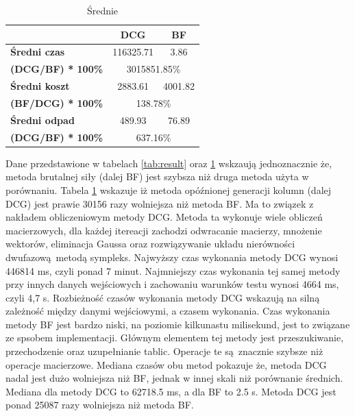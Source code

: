 \begin{table}[]
\centering
\caption{Średnie}
\label{tab:average}
\begin{tabular}{|l|c|c|}
\hline
                                           & \textbf{DCG}   & \textbf{BF}   \\ \hline
\textbf{Średni czas}                       & 116325.71      & 3.86          \\ \hline
\textbf{(DCG/BF) * 100\%}  & \multicolumn{2}{c|}{3015851.85\%} \\ \hline
\textbf{Średni koszt}                      & 2883.61        & 4001.82       \\ \hline
\textbf{(BF/DCG) * 100\%} & \multicolumn{2}{c|}{138.78\%}  \\ \hline
\textbf{Średni odpad}                      & 489.93         & 76.89         \\ \hline
\textbf{(DCG/BF) * 100\%} & \multicolumn{2}{c|}{637.16\%}    \\ \hline
\end{tabular}
\end{table}

Dane przedstawione w tabelach \ref{tab:result} oraz \ref{tab:average} wskzaują jednoznacznie że, metoda brutalnej siły (dalej BF) jest szybsza niż druga metoda użyta w porównaniu. Tabela \ref{tab:average} wskazuje iż metoda opóźnionej generacji kolumn (dalej DCG) jest prawie 30156 razy wolniejsza niż metoda BF. Ma to związek z nakładem obliczeniowym metody DCG. Metoda ta wykonuje wiele obliczeń macierzowych, dla każdej itereacji zachodzi odwracanie macierzy, mnożenie wektorów, eliminacja Gaussa oraz rozwiązywanie układu nierówności dwufazową metodą sympleks. Najwyższy czas wykonania metody DCG wynosi 446814 ms, czyli ponad 7 minut. Najmniejszy czas wykonania tej samej metody przy innych danych wejściowych i zachowaniu warunków testu wynosi 4664 ms, czyli 4,7 s. Rozbieżność czasów wykonania metody DCG wskazują na silną zależność między danymi wejściowymi, a czasem wykonania. Czas wykonania metody BF jest bardzo niski, na poziomie kilkunastu milisekund, jest to związane ze spsobem implementacji. Głównym elementem tej metody jest przeszukiwanie, przechodzenie oraz uzupełnianie tablic. Operacje te są znacznie szybsze niż operacje macierzowe. Mediana czasów obu metod pokazuje że, metoda DCG nadal jest dużo wolniejsza niż BF, jednak w innej skali niż porównanie średnich. Mediana dla metody DCG to 62718.5 ms, a dla BF to 2.5 s. Metoda DCG jest ponad 25087 razy wolniejsza niż metoda BF.

